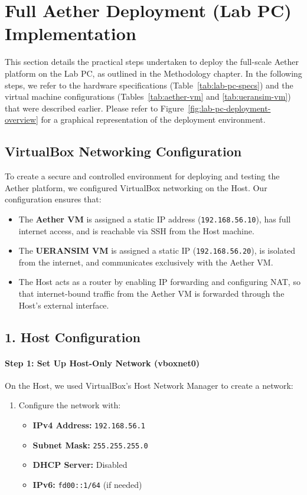 \newpage

\section{Full Aether Deployment (Lab PC) Implementation}
\label{sec:full-aether-deployment-impl}

This section details the practical steps undertaken to deploy the full-scale Aether platform on the Lab PC, as outlined in the Methodology chapter. In the following steps, we refer to the hardware specifications (Table~\ref{tab:lab-pc-specs}) and the virtual machine configurations (Tables~\ref{tab:aether-vm} and \ref{tab:ueransim-vm}) that were described earlier. Please refer to Figure~\ref{fig:lab-pc-deployment-overview} for a graphical representation of the deployment environment.

\subsection{VirtualBox Networking Configuration}
\label{subsec:vb-networking-config}

To create a secure and controlled environment for deploying and testing the Aether platform, we configured VirtualBox networking on the Host. Our configuration ensures that:
\begin{itemize}
    \item The \textbf{Aether VM} is assigned a static IP address (\texttt{192.168.56.10}), has full internet access, and is reachable via SSH from the Host machine.
    \item The \textbf{UERANSIM VM} is assigned a static IP (\texttt{192.168.56.20}), is isolated from the internet, and communicates exclusively with the Aether VM.
    \item The Host acts as a router by enabling IP forwarding and configuring NAT, so that internet-bound traffic from the Aether VM is forwarded through the Host’s external interface.
\end{itemize}

\subsection*{1. Host Configuration}
\paragraph{Step 1: Set Up Host-Only Network (vboxnet0)}
On the Host, we used VirtualBox's Host Network Manager to create a network:
\begin{enumerate}
    \item Configure the network with:
    \begin{itemize}
        \item \textbf{IPv4 Address:} \texttt{192.168.56.1}
        \item \textbf{Subnet Mask:} \texttt{255.255.255.0}
        \item \textbf{DHCP Server:} Disabled
        \item \textbf{IPv6:} \texttt{fd00::1/64} (if needed)
    \end{itemize}
\end{enumerate}


